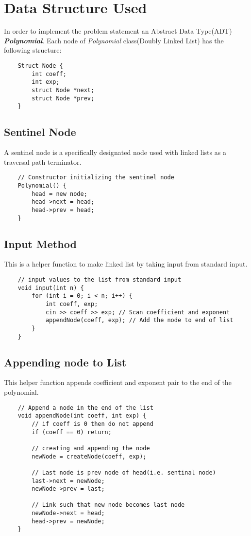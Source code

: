 \section{Data Structure Used}
\justifying
\par
In order to implement the problem statement an Abstract Data Type(ADT) \textbf{\textit{Polynomial}}. Each node of \textit{Polynomial} class(Doubly Linked List) has the following structure:

\begin{lstlisting}
    Struct Node {
        int coeff;
        int exp;
        struct Node *next;
        struct Node *prev;
    }
\end{lstlisting}

\subsection{Sentinel Node}
A sentinel node is a specifically designated node used with linked lists as a traversal path terminator.
\begin{lstlisting}
    // Constructor initializing the sentinel node
    Polynomial() {
        head = new node;
        head->next = head;
        head->prev = head;
    }
\end{lstlisting}

\subsection{Input Method}
This is a helper function to make linked list by taking input from standard input.
\begin{lstlisting}
    // input values to the list from standard input
    void input(int n) {
        for (int i = 0; i < n; i++) {
            int coeff, exp;
            cin >> coeff >> exp; // Scan coefficient and exponent
            appendNode(coeff, exp); // Add the node to end of list
        }
    }
\end{lstlisting}

\subsection{Appending node to List}
This helper function appends coefficient and exponent pair to the end of the polynomial.
\begin{lstlisting}
    // Append a node in the end of the list
    void appendNode(int coeff, int exp) {
        // if coeff is 0 then do not append
        if (coeff == 0) return;
        
        // creating and appending the node
        newNode = createNode(coeff, exp);
        
        // Last node is prev node of head(i.e. sentinal node)
        last->next = newNode;
        newNode->prev = last;
        
        // Link such that new node becomes last node
        newNode->next = head;
        head->prev = newNode;
    }
\end{lstlisting}

